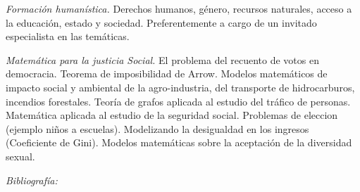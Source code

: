 \documentclass[a4paper, 12pt]{article}
\begin{document}
\begin{description}
 \item{\emph{Formación humanística.}}  Derechos humanos, género, recursos naturales, acceso a la educación, estado y sociedad. Preferentemente a cargo de un  invitado especialista en las temáticas.
 
 \item{\emph{Matemática para la justicia Social.}} El problema del recuento de votos en democracia. Teorema de imposibilidad de Arrow. Modelos matemáticos de impacto social y ambiental de la agro-industria, del transporte de hidrocarburos, incendios forestales. Teoría de grafos aplicada al estudio del tráfico de personas.  Matemática aplicada al estudio de la seguridad social. Problemas de eleccion (ejemplo niños a escuelas). Modelizando la desigualdad en los ingresos (Coeficiente de Gini). Modelos matemáticas sobre la aceptación de la diversidad sexual.   
\end{description}


\emph{Bibliografía:} \cite{buell2021mathematics,karaali2021mathematics,karaali2019mathematics,doi:10.1080/10511970.2018.1530707,doi:10.1080/10511970.2018.1512538,doi:10.1080/10511970.2018.1456498,doi:10.1080/10511970.2018.1530706,doi:10.1080/10511970.2018.1456497,doi:10.1080/10511970.2018.1472683,FredRoberts1395,JuanCarlosCortes1396,DonaldG.Saari1397,LeeRudolph1398,UrszulaStrawinska-Zanko1399,HuijiongWang1400,AhmadK.Naimzada1401,ClaudioCioffi-Revilla1402}

 




\end{document}
